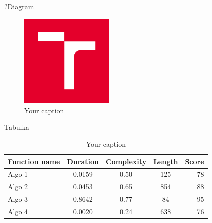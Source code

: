 \documentclass[aspectratio=1610]{beamer}
\begin{document}
\begin{frame}{?Diagram}
    \begin{center}
        \begin{figure}
            \includegraphics[width=0.4\textwidth]{logo.png}
            \caption{Your caption}
        \end{figure}
    \end{center}
\end{frame}

\begin{frame}{Tabulka}
    \begin{center}
        \begin{table}
            \caption{Your caption}
            \begin{tabular}{l | c | c | c | r}
                \textbf{Function name} & \textbf{Duration} & \textbf{Complexity} & \textbf{Length} & \textbf{Score}\\
                \hline \hline
                Algo 1 & 0.0159 & 0.50 & 125 & 78 \\
                Algo 2 & 0.0453 & 0.65 & 854 & 88 \\
                Algo 3 & 0.8642 & 0.77 &  84 & 95 \\
                Algo 4 & 0.0020 & 0.24 & 638 & 76 \\
            \end{tabular}
        \end{table}
    \end{center}
\end{frame}
\end{document}
